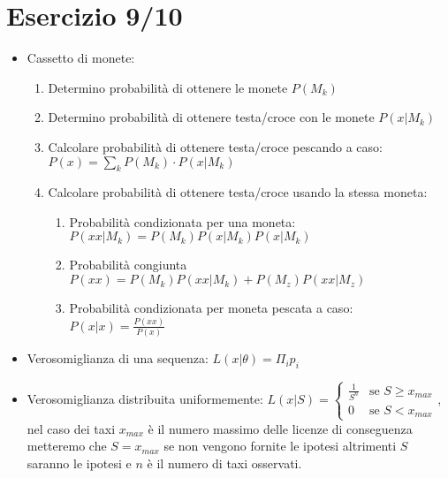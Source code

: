 \documentclass[12pt]{article}
\begin{document}
\section{Esercizio 9/10}
\begin{itemize}
    \item Cassetto di monete: \begin{enumerate}
        \item Determino probabilità di ottenere le monete $P(M_{k})$
        \item Determino probabilità di ottenere testa/croce con le monete $P(x|M_{k})$
        \item Calcolare probabilità di ottenere testa/croce pescando a caso: $P(x) = \sum_{k}P(M_{k})\cdot P(x|M_{k})$
        \item Calcolare probabilità di ottenere testa/croce usando la stessa moneta: \begin{enumerate}
            \item Probabilità condizionata per una moneta: $P(xx|M_{k})=P(M_{k})P(x|M_{k})P(x|M_{k})$
            \item Probabilità congiunta $P(xx) = P(M_{k})P(xx|M_{k})+P(M_{z})P(xx|M_{z})$
            \item Probabilità condizionata per moneta pescata a caso: $P(x|x) = \frac{P(xx)}{P(x)}$ 
        \end{enumerate}
    \end{enumerate}
    \item Verosomiglianza di una sequenza: $L(x|\theta)=\Pi_{i}p_{i}$
    \item Verosomiglianza distribuita uniformemente: $L(x|S)=\begin{cases}
        \frac{1}{S^{n}} & \text{se } S \geq x_{max}\\
        0 & \text{se } S < x_{max}
    \end{cases}$, nel caso dei taxi $x_{max}$ è il numero massimo delle licenze di conseguenza metteremo che $S=x_{max}$ se non vengono fornite le ipotesi altrimenti $S$ saranno le ipotesi e $n$ è il numero di taxi osservati.
\end{itemize}
\end{document}
